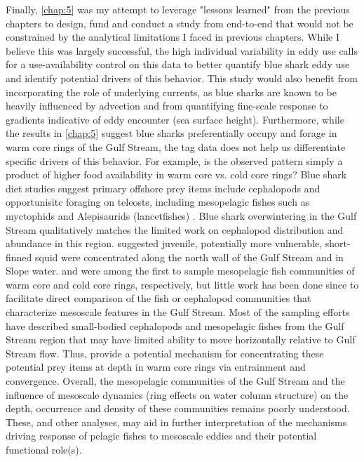 Finally, \cref{chap:5} was my attempt to leverage "lessons learned" from the previous chapters to design, fund and conduct a study from end-to-end that would not be constrained by the analytical limitations I faced in previous chapters. While I believe this was largely successful, the high individual variability in eddy use calls for a use-availability control on this data to better quantify blue shark eddy use and identify potential drivers of this behavior. This study would also benefit from incorporating the role of underlying currents, as blue sharks are known to be heavily influenced by advection \citep[\eg][]{Carey1990} and from quantifying fine-scale response to gradients indicative of eddy encounter (\eg sea surface height). Furthermore, while the results in \cref{chap:5} suggest blue sharks preferentially occupy and forage in warm core rings of the Gulf Stream, the tag data does not help us differentiate specific drivers of this behavior. For example, is the observed pattern simply a product of higher food availability in warm core vs. cold core rings? Blue shark diet studies suggest primary offshore prey items include cephalopods and opportunisitc foraging on teleosts, including mesopelagic fishes such as myctophids and Alepisaurids (lancetfishes) \citep{Kohler1988}. Blue shark overwintering in the Gulf Stream \citep[\cref{chap:5,}][]{Campana2011} qualitatively matches the limited work on cephalopod distribution and abundance in this region. \cite{Dawe1985} suggested juvenile, potentially more vulnerable, short-finned squid were concentrated along the north wall of the Gulf Stream and in Slope water. \cite{Olson1985} and \cite{Backus1982} were among the first to sample mesopelagic fish communities of warm core and cold core rings, respectively, but little work has been done since to facilitate direct comparison of the fish or cephalopod communities that characterize mesoscale features in the Gulf Stream. Most of the sampling efforts have described small-bodied cephalopods and mesopelagic fishes from the Gulf Stream region that may have limited ability to move horizontally relative to Gulf Stream flow. Thus, \cite{Olson1985} provide a potential mechanism for concentrating these potential prey items at depth in warm core rings via entrainment and convergence. Overall, the mesopelagic communities of the Gulf Stream and the influence of mesoscale dynamics (\eg ring effects on water column structure) on the depth, occurrence and density of these communities remains poorly understood. These, and other analyses, may aid in further interpretation of the mechanisms driving response of pelagic fishes to mesoscale eddies and their potential functional role(s).

